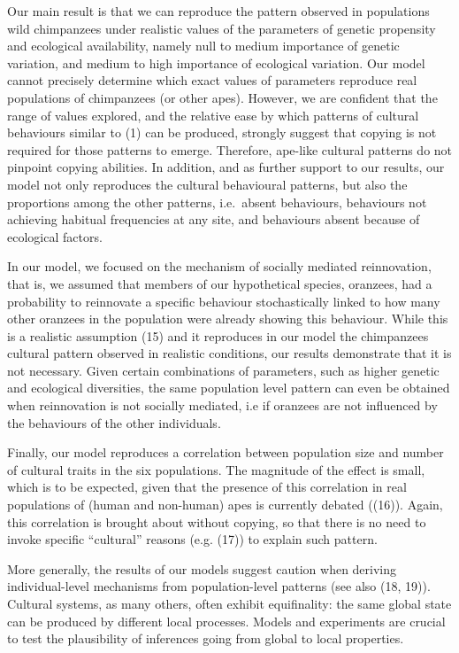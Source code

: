 \documentclass[9pt,twocolumn,twoside,]{pnas-new}
\begin{document}
Our main result is that we can reproduce the pattern observed in
populations wild chimpanzees under realistic values of the parameters of
genetic propensity and ecological availability, namely null to medium
importance of genetic variation, and medium to high importance of
ecological variation. Our model cannot precisely determine which exact
values of parameters reproduce real populations of chimpanzees (or other
apes). However, we are confident that the range of values explored, and
the relative ease by which patterns of cultural behaviours similar to
(1) can be produced, strongly suggest that copying is not required for
those patterns to emerge. Therefore, ape-like cultural patterns do not
pinpoint copying abilities. In addition, and as further support to our
results, our model not only reproduces the cultural behavioural
patterns, but also the proportions among the other patterns, i.e.~absent
behaviours, behaviours not achieving habitual frequencies at any site,
and behaviours absent because of ecological factors.

In our model, we focused on the mechanism of socially mediated
reinnovation, that is, we assumed that members of our hypothetical
species, oranzees, had a probability to reinnovate a specific behaviour
stochastically linked to how many other oranzees in the population were
already showing this behaviour. While this is a realistic assumption
(15) and it reproduces in our model the chimpanzees cultural pattern
observed in realistic conditions, our results demonstrate that it is not
necessary. Given certain combinations of parameters, such as higher
genetic and ecological diversities, the same population level pattern
can even be obtained when reinnovation is not socially mediated, i.e if
oranzees are not influenced by the behaviours of the other individuals.

Finally, our model reproduces a correlation between population size and
number of cultural traits in the six populations. The magnitude of the
effect is small, which is to be expected, given that the presence of
this correlation in real populations of (human and non-human) apes is
currently debated ((16)). Again, this correlation is brought about
without copying, so that there is no need to invoke specific
``cultural'' reasons (e.g. (17)) to explain such pattern.

More generally, the results of our models suggest caution when deriving
individual-level mechanisms from population-level patterns (see also
(18, 19)). Cultural systems, as many others, often exhibit equifinality:
the same global state can be produced by different local processes.
Models and experiments are crucial to test the plausibility of
inferences going from global to local properties.
\end{document}
